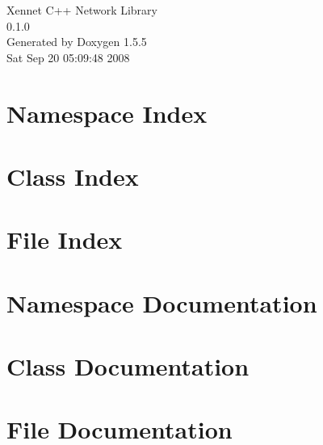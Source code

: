 \documentclass[a4paper]{book}
\begin{document}
\begin{titlepage}
\vspace*{7cm}
\begin{center}
{\Large Xennet C++ Network Library \\[1ex]\large 0.1.0 }\\
\vspace*{1cm}
{\large Generated by Doxygen 1.5.5}\\
\vspace*{0.5cm}
{\small Sat Sep 20 05:09:48 2008}\\
\end{center}
\end{titlepage}
\clearemptydoublepage
{}
\tableofcontents
\clearemptydoublepage
{}
\chapter{Namespace Index}

\chapter{Class Index}

\chapter{File Index}

\chapter{Namespace Documentation}

\chapter{Class Documentation}







\chapter{File Documentation}





















\printindex
\end{document}
